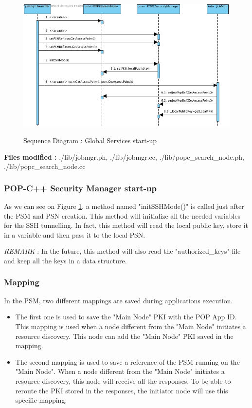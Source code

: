 \begin{figure}[ht]
	\caption{Sequence Diagram : Global Services start-up}
  	\centering
	\includegraphics[width=1.0\textwidth]{../gs_startup.jpg}
	\label{fig:gc_startup}
\end{figure}\s

\textbf{Files modified :} ./lib/jobmgr.ph, ./lib/jobmgr.cc, ./lib/popc\_search\_node.ph, ./lib/popc\_search\_node.cc

\subsubsection{POP-C++ Security Manager start-up}
As we can see on Figure \ref{fig:gc_startup}, a method named "initSSHMode()" is called just after the PSM and PSN creation. This method will initialize all the needed variables for the SSH tunnelling. In fact, this method will read the local public key, store it in a variable and then pass it to the local PSN.\s

\textit{REMARK} : In the future, this method will also read the "authorized\_keys" file and keep all the keys in a data structure.

\subsubsection{Mapping}
In the PSM, two different mappings are saved during applications execution. 

\begin{itemize}
\item The first one is used to save the "Main Node" PKI with the POP App ID. This mapping is used when a node different from the "Main Node" initiates a resource discovery. This node can add the "Main Node" PKI saved in the mapping.
\item The second mapping is used to save a reference of the PSM running on the "Main Node". When a node different from the "Main Node" initiates a resource discovery, this node will receive all the responses. To be able to reroute the PKI stored in the responses, the initiator node will use this specific mapping.
\end{itemize}

